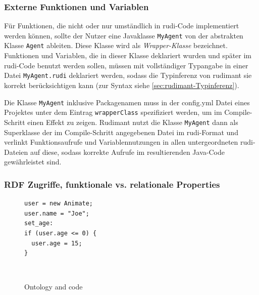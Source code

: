 \subsubsection{Externe Funktionen und Variablen}
\label{sec:rudimant-global}

Für Funktionen, die nicht oder nur umständlich in rudi-Code implementiert
werden können, sollte der Nutzer eine Javaklasse \texttt{MyAgent} von der
abstrakten Klasse \texttt{Agent} ableiten. Diese Klasse wird als
\emph{Wrapper-Klasse} bezeichnet. Funktionen und Variablen, die in
dieser Klasse deklariert wurden und später im rudi-Code benutzt werden sollen,
müssen mit vollständiger Typangabe in einer Datei \texttt{MyAgent.rudi}
deklariert werden, sodass die Typinferenz von rudimant sie korrekt
berücksichtigen kann (zur Syntax siehe \ref{sec:rudimant-Typinferenz}).

Die Klasse \texttt{MyAgent} inklusive Packagenamen muss in der config.yml Datei
eines Projektes unter dem Eintrag \texttt{wrapperClass} spezifiziert werden, um
im Compile-Schritt einen Effekt zu zeigen. Rudimant nutzt die Klasse
\texttt{MyAgent} dann als Superklasse der im Compile-Schritt angegebenen Datei
im rudi-Format und verlinkt Funktionsaufrufe und Variablennutzungen in allen
untergeordneten rudi-Dateien auf diese, sodass korrekte Aufrufe im
resultierenden Java-Code gewährleistet sind.

\subsubsection{RDF Zugriffe, funktionale vs. relationale Properties}
\label{sec:rdfaccesses}

\begin{figure}[htb]
\begin{minipage}{0.5\columnwidth}
\small%
\begin{verbatim}
user = new Animate;
user.name = "Joe";
set_age:
if (user.age <= 0) {
  user.age = 15;
}
\end{verbatim}
\end{minipage}\ \vrule\hspace{1ex}
\begin{minipage}{0.44\columnwidth}
    \small{}
\end{minipage}
  \caption{Ontology and \vonda code}
  \label{fig:rdfobjects}
\end{figure}

